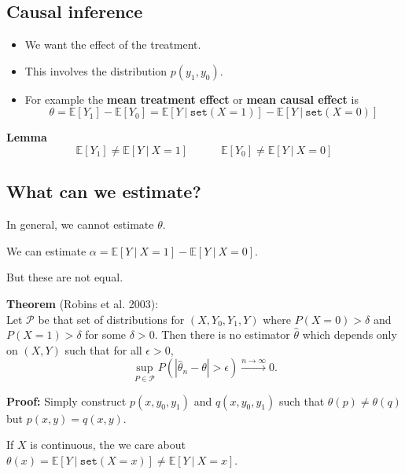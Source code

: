 \documentclass[]{article}
\begin{document}
\hypertarget{causal-inference-1}{%
\subsection{Causal inference}\label{causal-inference-1}}

\begin{itemize}
\item
  We want the effect of the treatment.
\item
  This involves the distribution \(p(y_1,y_0)\).
\item
  For example the \textbf{mean treatment effect} or \textbf{mean causal
  effect} is \[
  \theta = \mathbb{E}\left[ Y_1 \right]-\mathbb{E}\left[ Y_0 \right] = \mathbb{E}\left[ Y\ \vert\ \texttt{set}(X=1) \right] - \mathbb{E}\left[ Y\ \vert\ \texttt{set}(X=0) \right]
  \]
\end{itemize}

\textbf{Lemma} \[ 
\mathbb{E}\left[ Y_1 \right] \neq \mathbb{E}\left[ Y\ \vert\ X=1 \right] \quad\quad\quad \mathbb{E}\left[ Y_0 \right] \neq \mathbb{E}\left[ Y\ \vert\ X=0 \right]
\]

\hypertarget{what-can-we-estimate}{%
\subsection{What can we estimate?}\label{what-can-we-estimate}}

In general, we cannot estimate \(\theta\).

We can estimate
\(\alpha = \mathbb{E}\left[ Y\ \vert\ X=1 \right] - \mathbb{E}\left[ Y\ \vert\ X=0 \right]\).

But these are not equal.

\textbf{Theorem} (Robins et al. 2003):\\
Let \(\mathcal{P}\) be that set of distributions for \((X,Y_0,Y_1,Y)\)
where \(P(X=0)>\delta\) and \(P(X=1)>\delta\) for some \(\delta>0\).
Then there is no estimator \(\widehat{\theta}\) which depends only on
\((X,Y)\) such that for all \(\epsilon>0\), \[
\sup_{P\in\mathcal{P}} P\left(|\widehat{\theta}_n-\theta|>\epsilon\right) \xrightarrow{n\rightarrow\infty} 0.
\]

\textbf{Proof:} Simply construct \(p(x,y_0,y_1)\) and \(q(x,y_0,y_1)\)
such that \(\theta(p) \neq \theta(q)\) but \(p(x,y) = q(x,y)\).

If \(X\) is continuous, the we care about
\(\theta(x) = \mathbb{E}\left[ Y\ \vert\ \texttt{set}(X=x) \right] \neq \mathbb{E}\left[ Y\ \vert\ X=x \right]\).
\end{document}
